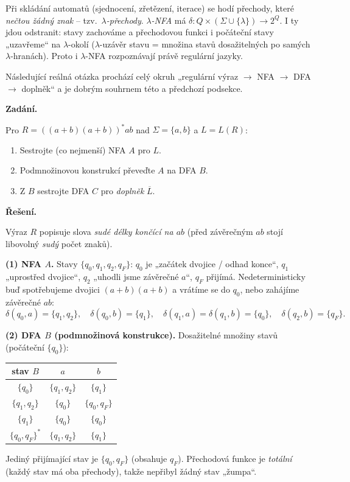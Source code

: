 \documentclass[11pt,a4paper]{article}
\begin{document}
\begin{poznamka}
Při skládání automatů (sjednocení, zřetězení, iterace) se hodí přechody, které \emph{nečtou žádný znak} -- tzv.\ \emph{$\lambda$-přechody}. \emph{$\lambda$-NFA} má $\delta\colon Q\times(\Sigma\cup\{\lambda\})\to 2^Q$. I ty jdou odstranit: stavy zachováme a přechodovou funkci i počáteční stavy „uzavřeme`` na $\lambda$-okolí ($\lambda$-uzávěr stavu = množina stavů dosažitelných po samých $\lambda$-hranách). Proto i $\lambda$-NFA rozpoznávají právě regulární jazyky.
\end{poznamka}

Následující reálná otázka prochází celý okruh „regulární výraz $\to$ NFA $\to$ DFA $\to$ doplněk`` a je dobrým souhrnem této a předchozí podsekce.

\begin{priklad}
\par
\textbf{Zadání.}\par
Pro $R=((a+b)(a+b))^*ab$ nad $\Sigma=\{a,b\}$ a $L=L(R)$:
\begin{enumerate}
  \item Sestrojte (co nejmenší) NFA $A$ pro $L$.
  \item Podmnožinovou konstrukcí převeďte $A$ na DFA $B$.
  \item Z $B$ sestrojte DFA $C$ pro \emph{doplněk} $\overline L$.
\end{enumerate}

\smallskip
\textbf{Řešení.}\par
Výraz $R$ popisuje slova \emph{sudé délky končící na $ab$} (před závěrečným $ab$ stojí libovolný \emph{sudý} počet znaků).

\textbf{(1) NFA $A$.} Stavy $\{q_0,q_1,q_2,q_F\}$: $q_0$ je „začátek dvojice / odhad konce``, $q_1$ „uprostřed dvojice``, $q_2$ „uhodli jsme závěrečné $a$``, $q_F$ přijímá. Nedeterministicky buď spotřebujeme dvojici $(a{+}b)(a{+}b)$ a vrátíme se do $q_0$, nebo zahájíme závěrečné $ab$:
\[ \delta(q_0,a)=\{q_1,q_2\},\quad \delta(q_0,b)=\{q_1\},\quad \delta(q_1,a)=\delta(q_1,b)=\{q_0\},\quad \delta(q_2,b)=\{q_F\}. \]

\textbf{(2) DFA $B$ (podmnožinová konstrukce).} Dosažitelné množiny stavů (počáteční $\{q_0\}$):
\begin{center}\small
\begin{tabular}{c|cc}
\toprule
stav $B$ & $a$ & $b$\\
\midrule
$\{q_0\}$ & $\{q_1,q_2\}$ & $\{q_1\}$\\
$\{q_1,q_2\}$ & $\{q_0\}$ & $\{q_0,q_F\}$\\
$\{q_1\}$ & $\{q_0\}$ & $\{q_0\}$\\
$\{q_0,q_F\}^{*}$ & $\{q_1,q_2\}$ & $\{q_1\}$\\
\bottomrule
\end{tabular}
\end{center}
Jediný přijímající stav je $\{q_0,q_F\}$ (obsahuje $q_F$). Přechodová funkce je \emph{totální} (každý stav má oba přechody), takže nepřibyl žádný stav „žumpa``.


\end{priklad}
\end{document}
